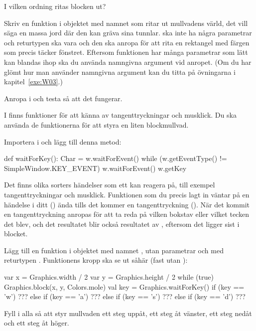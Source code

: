 \Subtask\Pen
I vilken ordning ritas blocken ut?


\Subtask
Skriv en funktion i objektet  med namnet  som ritar ut mullvadens värld, det vill säga en massa jord där den kan gräva sina tunnlar.
 ska inte ha några parametrar och returtypen ska vara  och den ska anropa  för att rita en rektangel med färgen  som precis täcker fönstret.
Eftersom funktionen har många parametrar som lätt kan blandas ihop ska du använda namngivna argument vid anropet.
(Om du har glömt hur man använder namngivna argument kan du titta på övningarna i kapitel~\ref{exe:W03}.)

\Subtask
Anropa  i  och testa så att det fungerar.

\Task
I  finns funktioner för att känna av tangenttryckningar och musklick.
Du ska använda de funktionerna för att styra en liten blockmullvad.

\Subtask
Importera  i  och lägg till denna metod:
\begin{Code}
def waitForKey(): Char = {
  w.waitForEvent()
  while (w.getEventType() != SimpleWindow.KEY_EVENT) w.waitForEvent()
  w.getKey
}
\end{Code}
Det finns olika sorters händelser som ett  kan reagera på, till exempel tangenttryckningar och musklick.
Funktionen som du precis lagt in väntar på en händelse i ditt  () ända tills det kommer en tangenttryckning ().
När det kommit en tangenttryckning anropas  för att ta reda på vilken bokstav eller vilket tecken det blev, och det resultatet blir också resultatet av , eftersom det ligger sist i blocket.

\Subtask
Lägg till en funktion i objektet  med namnet , utan parametrar och med returtypen .
Funktionens kropp ska se ut såhär (fast utan ):
\begin{Code}
{
  var x = Graphics.width / 2
  var y = Graphics.height / 2
  while (true) {
    Graphics.block(x, y, Colors.mole)
    val key = Graphics.waitForKey()
    if (key == 'w') ???
    else if (key == 'a') ???
    else if (key == 's') ???
    else if (key == 'd') ???
  }
}
\end{Code}
Fyll i alla  så att  styr mullvaden ett steg uppåt,  ett steg åt vänster,  ett steg nedåt och  ett steg åt höger.


